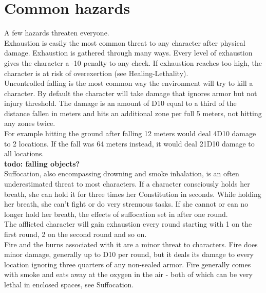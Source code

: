 \documentclass[12pt,a4paper,openany]{book}
\begin{document}
	\section{Common hazards}
	A few hazards threaten everyone.\\
	Exhaustion is easily the most common threat to any character after physical damage. Exhaustion is gathered through many ways. Every level of exhaustion gives the character a -10 penalty to any check. If exhaustion reaches too high, the character is at risk of overexertion (see Healing-Lethality).\\
	Uncontrolled falling is the most common way the environment will try to kill a character. By default the character will take damage that ignores armor but not injury threshold. The damage is an amount of D10 equal to a third of the distance fallen in meters and hits an additional zone per full 5 meters, not hitting any zones twice.\\
	For example hitting the ground after falling 12 meters would deal 4D10 damage to 2 locations. If the fall was 64 meters instead, it would deal 21D10 damage to all locations.\\
	\textbf{todo: falling objects?}\\
	Suffocation, also encompassing drowning and smoke inhalation, is an often underestimated threat to most characters. If a character consciously holds her breath, she can hold it for three times her Constitution in seconds. While holding her breath, she can’t fight or do very strenuous tasks. If she cannot or can no longer hold her breath, the effects of suffocation set in after one round.\\
	The afflicted character will gain exhaustion every round starting with 1 on the first round, 2 on the second round and so on.\\
	Fire and the burns associated with it are a minor threat to characters. Fire does minor damage, generally up to D10 per round, but it deals its damage to every location ignoring three quarters of any non-sealed armor. Fire generally comes with smoke and eats away at the oxygen in the air - both of which can be very lethal in enclosed spaces, see Suffocation.\\
\end{document}
